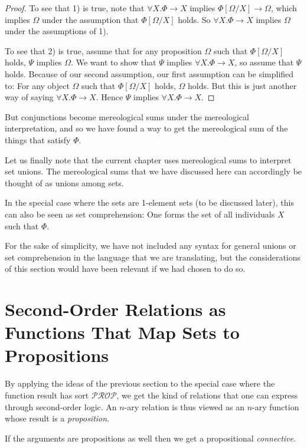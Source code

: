 \documentclass[12pt]{book}
\begin{document}
\begin{proof}
To see that 1) is true, note that $\forall X. \Phi \to X$ implies $\Phi[\Omega/X] \to \Omega$, which implies $\Omega$ under the assumption that $\Phi[\Omega/X]$ holds. So $\forall X. \Phi \to X$ implies $\Omega$ under the assumptions of 1).

To see that 2) is true, assume that for any proposition $\Omega$ such that $\Phi[\Omega/X]$ holds, $\Psi$ implies $\Omega$. We want to show that $\Psi$ implies $\forall X. \Phi \to X$, so assume that $\Psi$ holds. Because of our second assumption, our first assumption can be simplified to: For any object $\Omega$ such that $\Phi[\Omega/X]$ holds, $\Omega$ holds. But this is just another way of saying $\forall X. \Phi \to X$. Hence $\Psi$ implies $\forall X. \Phi \to X$.
\end{proof}

But conjunctions become mereological sums under the mereological interpretation, and so we have found a way to get the mereological sum of the things that satisfy $\Phi$.

Let us finally note that the current chapter uses mereological sums to interpret set unions. The mereological sums that we have discussed here can accordingly be thought of as unions among sets.

In the special case where the sets are 1-element sets (to be discussed later), this can also be seen as set comprehension: One forms the set of all individuals $X$ such that $\Phi$.

For the sake of simplicity, we have not included any syntax for general unions or set comprehension in the language that we are translating, but the considerations of this section would have been relevant if we had chosen to do so.

\section{Second-Order Relations as Functions That Map Sets to Propositions} \label{second_order_relations_as_functions}
By applying the ideas of the previous section to the special case where the function result has sort $\mathcal{PROP}$, we get the kind of relations that one can express through second-order logic. An $n$-ary relation is thus viewed as an $n$-ary function whose result is a \textit{proposition}.

If the arguments are propositions as well then we get a propositional \textit{connective}.
\end{document}
